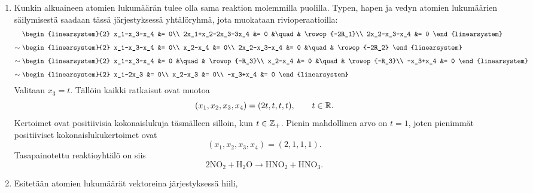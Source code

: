\documentclass[11pt,a4paper]{amsart}
\begin{document}
\begin{solution}
\leavevmode\par
\begin{enumerate}[label=\alph*)]
\item Kunkin alkuaineen atomien lukumäärän tulee olla sama reaktion
  molemmilla puolilla. Typen, hapen ja vedyn atomien lukumäärien
  säilymisestä saadaan tässä järjestyksessä yhtälöryhmä, jota
  muokataan rivioperaatioilla:
  \[
    \begin{aligned}
      &
      \begin{linearsystem}{2}
        x_1-x_3-x_4 &= 0\\
        2x_1+x_2-2x_3-3x_4 &= 0 &\quad& \rowop{-2R_1}\\
        2x_2-x_3-x_4 &= 0
      \end{linearsystem}\\[1ex]
      \sim{}&
      \begin{linearsystem}{2}
        x_1-x_3-x_4 &= 0\\
        x_2-x_4 &= 0\\
        2x_2-x_3-x_4 &= 0 &\quad& \rowop{-2R_2}
      \end{linearsystem}\\[1ex]
      \sim{}&
      \begin{linearsystem}{2}
        x_1-x_3-x_4 &= 0 &\quad& \rowop{-R_3}\\
        x_2-x_4 &= 0 &\quad& \rowop{-R_3}\\
        -x_3+x_4 &= 0
      \end{linearsystem}\\[1ex]
      \sim{}&
      \begin{linearsystem}{2}
        x_1-2x_3 &= 0\\
        x_2-x_3 &= 0\\
        -x_3+x_4 &= 0
      \end{linearsystem}
    \end{aligned}
  \]
  Valitaan \(x_3=t\). Tällöin kaikki ratkaisut ovat muotoa
  \[
    (x_1,x_2,x_3,x_4)=(2t,t,t,t), \qquad t\in\mathbb{R}.
  \]
  Kertoimet ovat positiivisia kokonaislukuja täsmälleen silloin, kun
  \(t\in\mathbb{Z}_+\). Pienin mahdollinen arvo on \(t=1\), joten pienimmät
  positiiviset kokonaislukukertoimet ovat
  \[
    (x_1,x_2,x_3,x_4)=(2,1,1,1).
  \]
  Tasapainotettu reaktioyhtälö on siis
  \[
    2\mathrm{NO}_2+\mathrm{H}_2\mathrm{O}
    \longrightarrow \mathrm{HNO}_2+\mathrm{HNO}_3.
  \]
\item Esitetään atomien lukumäärät vektoreina järjestyksessä hiili,

\end{enumerate}
\end{solution}
\end{document}
